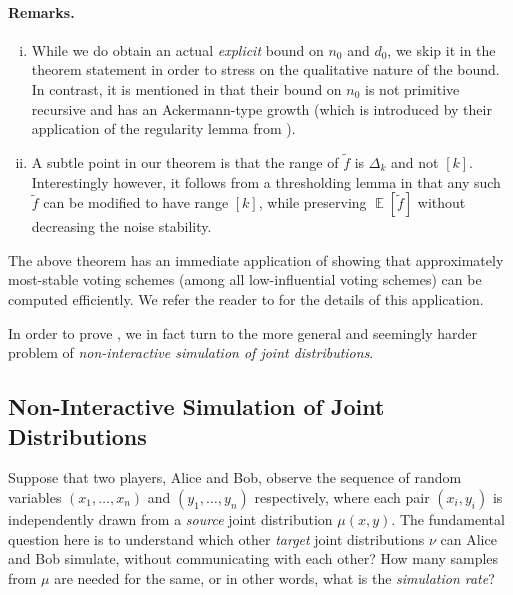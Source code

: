 \documentclass[11pt]{article}
\DeclareMathOperator*{\Ex}{\mathbb{E}}
\newcommand{\wtilde}[1]{\widetilde{#1}}
\begin{document}
\paragraph{Remarks.}
\begin{enumerate}[(i)]
	\item While we do obtain an actual {\em explicit} bound on $n_0$ and $d_0$, we skip it in the theorem statement in order to stress on the qualitative nature of the bound. In contrast, it is mentioned in \cite{DMN_NoiseStabilityComputable} that their bound on $n_0$ is not primitive recursive and has an Ackermann-type growth (which is introduced by their application of the regularity lemma from \cite{de2014efficient}).
	\item A subtle point in our theorem is that the range of $\wtilde{f}$ is $\Delta_k$ and not $[k]$. Interestingly however, it follows from a thresholding lemma in \cite[Lemma 15 \& 16]{DMN_NoiseStabilityComputable} that any such $\wtilde{f}$ can be modified to have range $[k]$, while preserving $\Ex[\wtilde{f}]$ without decreasing the noise stability.
\end{enumerate}

\noindent The above theorem has an immediate application of showing that approximately most-stable voting schemes (among all low-influential voting schemes) can be computed efficiently. We refer the reader to \cite{DMN_NoiseStabilityComputable} for the details of this application.

In order to prove , we in fact turn to the more general and seemingly harder problem of {\em non-interactive simulation of joint distributions}.

\subsection{Non-Interactive Simulation of Joint Distributions}

Suppose that two players, Alice and Bob, observe the sequence of random variables $(x_1, \ldots, x_n)$ and $(y_1, \ldots, y_n)$ respectively, where each pair $(x_i, y_i)$ is independently drawn from a {\em source} joint distribution $\mu(x,y)$. The fundamental question here is to understand which other {\em target} joint distributions $\nu$ can Alice and Bob simulate, without communicating with each other? How many samples from $\mu$ are needed for the same, or in other words, what is the {\em simulation rate}?
\end{document}
